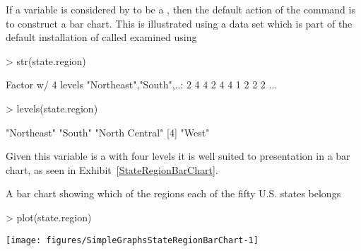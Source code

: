 If a variable is considered by \R{} to be a , then the default action of the  command is to construct a bar chart. This is illustrated using a data set which is part of the default installation of \R{} called  examined using
\begin{Schunk}
\begin{Sinput}
> str(state.region)
\end{Sinput}
\begin{Soutput}
 Factor w/ 4 levels "Northeast","South",..: 2 4 4 2 4 4 1 2 2 2 ...
\end{Soutput}
\begin{Sinput}
> levels(state.region)
\end{Sinput}
\begin{Soutput}
[1] "Northeast"     "South"         "North Central"
[4] "West"         
\end{Soutput}
\end{Schunk}
Given this variable is a  with four levels it is well suited to presentation in a bar chart, as seen in Exhibit~\ref{StateRegionBarChart}.

\begin{exhibit}
\begin{center}
\caption{A bar chart showing which of the regions each of the fifty U.S. states belongs}
\label{StateRegionBarChart}
\begin{Schunk}
\begin{Sinput}
> plot(state.region)
\end{Sinput}

\texttt{[image: figures/SimpleGraphsStateRegionBarChart-1]} \end{Schunk}
\end{center}
\end{exhibit}

